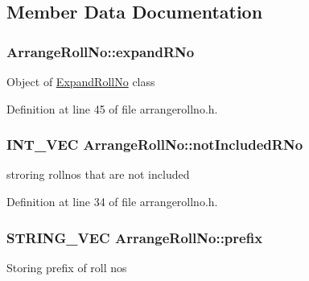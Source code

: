 \subsection{\-Member \-Data \-Documentation}
\hypertarget{classArrangeRollNo_a7ddd59b57f85cf6fea265d38c284df92}{
\subsubsection[{expand\-R\-No}]{ {\bf \-Arrange\-Roll\-No\-::expand\-R\-No}}}\label{classArrangeRollNo_a7ddd59b57f85cf6fea265d38c284df92}
\-Object of \hyperlink{classExpandRollNo}{\-Expand\-Roll\-No} class 

\-Definition at line 45 of file arrangerollno.\-h.

\hypertarget{classArrangeRollNo_a1f6740950e3180731b74c3ecdc19b98c}{
\subsubsection[{not\-Included\-R\-No}]{\setlength{\rightskip}{0pt plus 5cm}\-I\-N\-T\-\_\-\-V\-E\-C {\bf \-Arrange\-Roll\-No\-::not\-Included\-R\-No}}}\label{classArrangeRollNo_a1f6740950e3180731b74c3ecdc19b98c}
stroring rollnos that are not included 

\-Definition at line 34 of file arrangerollno.\-h.

\hypertarget{classArrangeRollNo_ac70b1f6e601cc5786ef339a38ae18c6f}{
\subsubsection[{prefix}]{\setlength{\rightskip}{0pt plus 5cm}\-S\-T\-R\-I\-N\-G\-\_\-\-V\-E\-C {\bf \-Arrange\-Roll\-No\-::prefix}}}\label{classArrangeRollNo_ac70b1f6e601cc5786ef339a38ae18c6f}
\-Storing prefix of roll nos 

